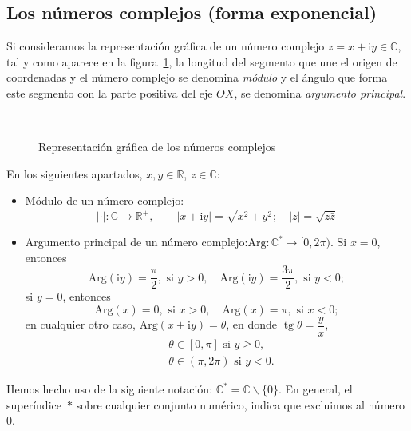 \subsection{Los números complejos (forma exponencial)}

Si consideramos la representación gráfica de un número complejo $z=x+\mathrm{i} y\in\mathbb{C}$, tal y como aparece en la figura~\ref{repr-comp}, la longitud del segmento que une el origen de coordenadas y el número complejo se denomina \emph{módulo} y el ángulo que forma este segmento con la parte positiva del eje $OX$, se denomina \emph{argumento principal}.

%
\begin{figure}[htb]
\begin{center}
\\[-3em]\rule{0pt}{0pt}
\end{center}
\caption{Representación gráfica de los números complejos}\label{repr-comp}
\end{figure}


\begin{definicion}%
En los siguientes apartados, $x,y\in\mathbb{R}$, $z\in\mathbb{C}$:
\begin{itemize}\setlength{\itemsep}{0pt}
\item
Módulo de un número complejo:
\[
|\cdot|\colon\mathbb{C}\to\mathbb{R}^+,\qquad |x+\mathrm{i} y| = \sqrt{x^2+y^2}; \quad |z|=\sqrt{z \bar{z}}
\]
\item
Argumento principal de un número complejo:\quad  $\mathrm{Arg}\colon\mathbb{C}^\ast\to[0,2\pi)$.\newline
Si $x=0$, entonces
\[
\mathrm{Arg}(\mathrm{i} y)=\dfrac{\pi}{2}, \text{ si } y > 0,\quad 
\mathrm{Arg}(\mathrm{i} y)=\dfrac{3\pi}{2}, \text{ si } y < 0;
\]
si $y=0$, entonces 
\[
\mathrm{Arg}(x)=0, \text{ si } x > 0,\quad 
\mathrm{Arg}(x)=\pi, \text{ si } x < 0;
\]
en cualquier otro caso, $\mathrm{Arg}(x+\mathrm{i} y)=\theta$, en donde $\operatorname{tg}\theta= \dfrac{y}{x}$,
\begin{align*}
& \theta\in [0,\pi]  \text{ si } y\ge 0, \\
& \theta\in (\pi,2\pi) \text{ si } y< 0.
\end{align*}
\end{itemize}
\end{definicion}
%
Hemos hecho uso de la siguiente notación: $\mathbb{C}^\ast=\mathbb{C}\smallsetminus\{0\}$.
En general, el superíndice~$\ast$ sobre cualquier conjunto numérico, indica que excluimos al número $0$.


